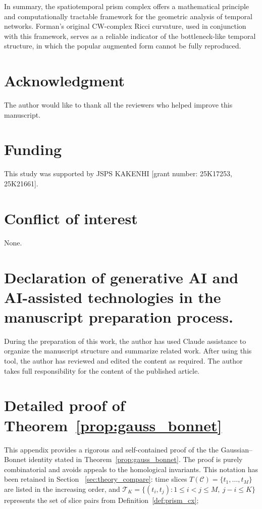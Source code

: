 \documentclass[
    pre,
    twocolumn,
    superscriptaddress,
    showpacs,
    nofootinbib,
    amsmath,
    amssymb,
    floatfix
]{revtex4-2}
\theoremstyle{plain} %
\theoremstyle{definition} %
\begin{document}
In summary, the spatiotemporal prism complex offers a
mathematical principle and computationally tractable framework
for the geometric analysis of temporal networks. Forman's
original CW-complex Ricci curvature, used in conjunction with this
framework, serves as a reliable indicator of the bottleneck-like temporal
structure, in which the popular augmented form cannot be fully reproduced.

\section*{Acknowledgment}
The author would like to thank all the reviewers who helped improve this manuscript. 

\section*{Funding}
This study was supported by JSPS KAKENHI [grant number: 25K17253, 25K21661].
\section*{Conflict of interest}
None.
\section*{Declaration of generative AI and AI-assisted technologies in the manuscript preparation process.}
During the preparation of this work, the author has used Claude assistance to organize the manuscript structure and summarize related work. After using this tool, the author has reviewed and edited the content as required. The author takes full responsibility for the content of the published article.

\appendix

\section{Detailed proof of Theorem~\ref{prop:gauss_bonnet}}\label{app:gauss_bonnet}

This appendix provides a rigorous and self-contained proof of the
the Gaussian--Bonnet identity stated in Theorem~\ref{prop:gauss_bonnet}.
The proof is purely combinatorial and avoids appeals to the homological
invariants.
This notation has been retained in Section ~\ref{sec:theory_compare}: time slices
$T(\mathcal{C}) = \{t_1, \ldots, t_M\}$ are listed in the increasing order,
and $\mathcal{T}_K = \{(t_i, t_j) : 1 \le i < j \le M,\ j - i \le K\}$
represents the set of slice pairs from Definition~\ref{def:prism_cx};
\end{document}
